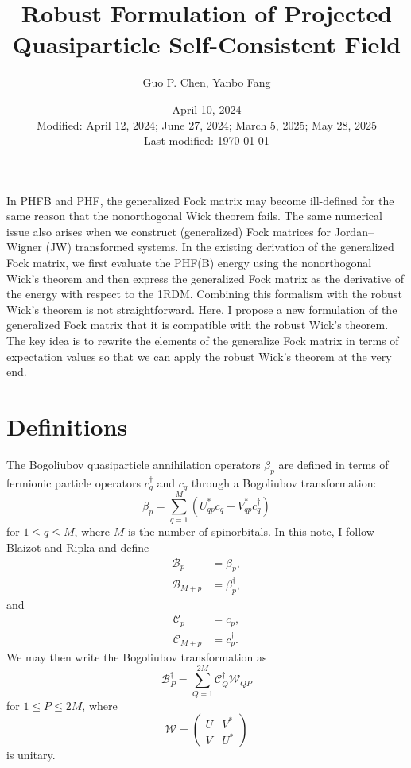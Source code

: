 \documentclass[11pt,letterpaper]{article}
\title{\textbf{Robust Formulation of Projected Quasiparticle Self-Consistent Field}}
\author{Guo P. Chen, Yanbo Fang}
\date{April 10, 2024\\Modified: April 12, 2024; June 27, 2024; March 5, 2025; May 28, 2025\\
Last modified: \today}
\begin{document}
\maketitle

In PHFB and PHF, the generalized Fock matrix may become ill-defined for the same reason that the
nonorthogonal Wick theorem fails. The same numerical issue also arises when we construct
(generalized) Fock matrices for Jordan--Wigner (JW) transformed systems.
In the existing derivation of the generalized Fock matrix, we first evaluate the PHF(B)
energy using the nonorthogonal Wick's theorem and then express the generalized Fock
matrix as the derivative of the energy with respect to the 1RDM.
Combining this formalism with the robust Wick's theorem \cite{robustwick} is not straightforward.
Here, I propose a new formulation of the generalized Fock matrix that it is compatible with
the robust Wick's theorem. The key idea is to rewrite the elements of
the generalize Fock matrix in terms of expectation values
so that we can apply the robust Wick's theorem at the very end.

\section{Definitions}

The Bogoliubov quasiparticle annihilation operators
$\beta_p$ are defined in terms of
fermionic particle operators $c^\dag_q$ and $c_q$
through a Bogoliubov transformation:
\begin{equation}
  \beta_p
  = \sum_{q=1}^M \left(U^*_{qp} c_q + V^*_{qp} c^\dag_q\right)
\end{equation}
for $1 \leq q \leq M$, where $M$ is the number of spinorbitals.
In this note, I follow Blaizot and Ripka and define
\begin{subequations}
\begin{align}
  \mathscr{B}_p
  &= \beta_p,\\
  \mathscr{B}_{M+p}
  &= \beta^\dag_p,
\end{align}
\end{subequations}
and
\begin{subequations}
\begin{align}
  \mathscr{C}_p
  &= c_p,\\
  \mathscr{C}_{M+p}
  &= c^\dag_p.
\end{align}
\end{subequations}
We may then write the Bogoliubov transformation as
\begin{equation}
  \label{eq:bogoliubov}
  \mathscr{B}_P^\dag = \sum_{Q=1}^{2M} \mathscr{C}_Q^\dag \mathcal{W}_{QP}
\end{equation}
for $1 \leq P \leq 2M$, where
\begin{equation}
  \mathcal{W} =
  \begin{pmatrix}
    U & V^*\\
    V & U^*
  \end{pmatrix}
\end{equation}
is unitary.
\end{document}
